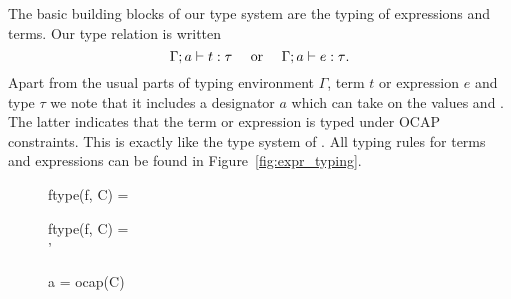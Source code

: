 The basic building blocks of our type system are the typing of expressions and
terms. Our type relation is written
\begin{equation}
  \mbox{$\Gamma;a\vdash t:\tau$} \quad \text{ or } \quad
  \mbox{$\Gamma;a\vdash e:\tau$}. \notag
\end{equation}
Apart from the usual parts of typing environment $\Gamma$, term $t$ or
expression $e$ and type $\tau$ we note that it includes a designator $a$ which
can take on the values \nocap{} and \ocap{}. The latter indicates that the term
or expression is typed under OCAP constraints. This is exactly like the type
system of \LaCasa{}. All typing rules for terms and expressions can be found in
Figure~\ref{fig:expr_typing}.

\begin{figure}[t]
  \centering
    { \andalso {}}
    {}

    \vspace{0.5em}


    \vspace{0.5em}

    
    \vspace{0.5em}


    \vspace{0.5em}

    { \andalso ftype(f, C) = \tau }
    {}
    
    \vspace{0.5em}

    { \andalso ftype(f, C) = \tau \\
     \andalso \tau' \stof \tau }
    {}

    \vspace{0.5em}

    {a = \ocap \Longrightarrow ocap(C)}
    {}


\end{figure}
